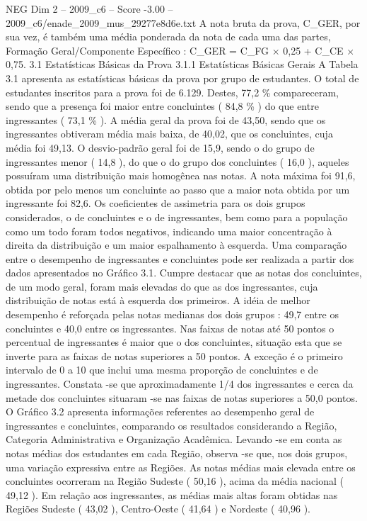 \begin{textsample}{NEG Dim 2 – 2009\_c6 – Score -3.00 – 2009\_c6/enade\_2009\_mus\_29277e8d6e.txt}
A nota bruta da prova, C\_GER, por sua vez, é também uma média ponderada da nota de cada uma das partes, Formação Geral/Componente Específico : C\_GER = C\_FG × 0,25 + C\_CE × 0,75. 3.1 Estatísticas Básicas da Prova 3.1.1 Estatísticas Básicas Gerais A Tabela 3.1 apresenta as estatísticas básicas da prova por grupo de estudantes.
O total de estudantes inscritos para a prova foi de 6.129.
Destes, 77,2 \% compareceram, sendo que a presença foi maior entre concluintes ( 84,8 \% ) do que entre ingressantes ( 73,1 \% ).
A média geral da prova foi de 43,50, sendo que os ingressantes obtiveram média mais baixa, de 40,02, que os concluintes, cuja média foi 49,13.
O desvio-padrão geral foi de 15,9, sendo o do grupo de ingressantes menor ( 14,8 ), do que o do grupo dos concluintes ( 16,0 ), aqueles possuíram uma distribuição mais homogênea nas notas.
A nota máxima foi 91,6, obtida por pelo menos um concluinte ao passo que a maior nota obtida por um ingressante foi 82,6.
Os coeficientes de assimetria para os dois grupos considerados, o de concluintes e o de ingressantes, bem como para a população como um todo foram todos negativos, indicando uma maior concentração à direita da distribuição e um maior espalhamento à esquerda.
Uma comparação entre o desempenho de ingressantes e concluintes pode ser realizada a partir dos dados apresentados no Gráfico 3.1.
Cumpre destacar que as notas dos concluintes, de um modo geral, foram mais elevadas do que as dos ingressantes, cuja distribuição de notas está à esquerda dos primeiros.
A idéia de melhor desempenho é reforçada pelas notas medianas dos dois grupos : 49,7 entre os concluintes e 40,0 entre os ingressantes.
Nas faixas de notas até 50 pontos o percentual de ingressantes é maior que o dos concluintes, situação esta que se inverte para as faixas de notas superiores a 50 pontos.
A exceção é o primeiro intervalo de 0 a 10 que inclui uma mesma proporção de concluintes e de ingressantes.
Constata -se que aproximadamente 1/4 dos ingressantes e cerca da metade dos concluintes situaram -se nas faixas de notas superiores a 50,0 pontos.
O Gráfico 3.2 apresenta informações referentes ao desempenho geral de ingressantes e concluintes, comparando os resultados considerando a Região, Categoria Administrativa e Organização Acadêmica.
Levando -se em conta as notas médias dos estudantes em cada Região, observa -se que, nos dois grupos, uma variação expressiva entre as Regiões.
As notas médias mais elevada entre os concluintes ocorreram na Região Sudeste ( 50,16 ), acima da média nacional ( 49,12 ).
Em relação aos ingressantes, as médias mais altas foram obtidas nas Regiões Sudeste ( 43,02 ), Centro-Oeste ( 41,64 ) e Nordeste ( 40,96 ).

\end{textsample}
